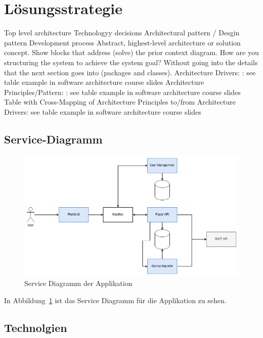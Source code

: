\section{Lösungsstrategie}
Top level architecture
Technologyy decisions
Architectural pattern / Desgin pattern
Development process
Abstract, highest-level architecture or solution concept. Show blocks that address (solve) the prior context diagram. How are you structuring the system to achieve the system goal? Without going into the details that the next section goes into (packages and classes).
Architecture Drivers: : see table example in software architecture course slides
Architecture Principles/Pattern: : see table example in software architecture course slides
Table with Cross-Mapping of Architecture Principles to/from Architecture Drivers: see table example in software architecture course slides

\subsection{Service-Diagramm}

\begin{figure}
    \centering
    \includegraphics[width=\textwidth]{images/cdc-05-service-diagram.drawio}
    \caption{Service Diagramm der Applikation}
    \label{fig:service-diagram}
\end{figure}

In Abbildung~\ref{fig:service-diagram} ist das Service Diagramm für die Applikation zu sehen.

\subsection{Technolgien}

